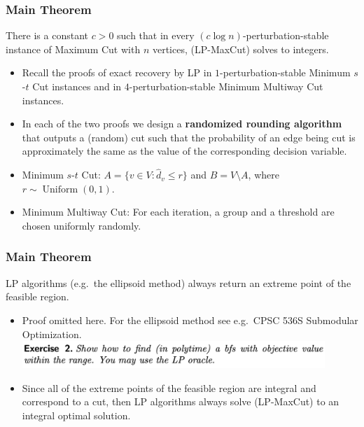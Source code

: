 \documentclass{beamer}
\DeclareMathOperator{\Uniform}{Uniform}
\begin{document}
    \begin{frame}
        \frametitle{Main Theorem}

        \begin{theorem}
            There is a constant $c > 0$ such that in every $(c \log n)$-perturbation-stable instance of {\sc Maximum Cut} with $n$ vertices, {\sc (LP-MaxCut)} solves to integers.
        \end{theorem}

        \pause

        \begin{itemize}
            \item Recall the proofs of exact recovery by LP in $1$-perturbation-stable {\sc Minimum $s$-$t$ Cut} instances and in $4$-perturbation-stable {\sc Minimum Multiway Cut} instances. \pause
            \item In each of the two proofs we design a {\bf randomized rounding algorithm} that outputs a (random) cut such that the probability of an edge being cut is approximately the same as the value of the corresponding decision variable. \pause
            \item {\sc Minimum $s$-$t$ Cut}: $A = \{ v \in V : \hat d_v \leq r \}$ and $B = V \setminus A$, where $r \sim \Uniform(0, 1)$. \pause
            \item {\sc Minimum Multiway Cut}: For each iteration, a group and a threshold are chosen uniformly randomly.
        \end{itemize}
    \end{frame}

    \begin{frame}
        \frametitle{Main Theorem}
    
        \begin{fact}
            LP algorithms (e.g.\ the ellipsoid method) always return an extreme point of the feasible region.
        \end{fact}

        \pause

        \begin{itemize}
            \item Proof omitted here. For the ellipsoid method see e.g.\ CPSC 536S Submodular Optimization. \pause
            \includegraphics[width=0.9\textwidth]{ellipsoid.png}
            \pause
            \item Since all of the extreme points of the feasible region are integral and correspond to a cut, then LP algorithms always solve {\sc (LP-MaxCut)} to an integral optimal solution.
        \end{itemize}
    \end{frame}
\end{document}
